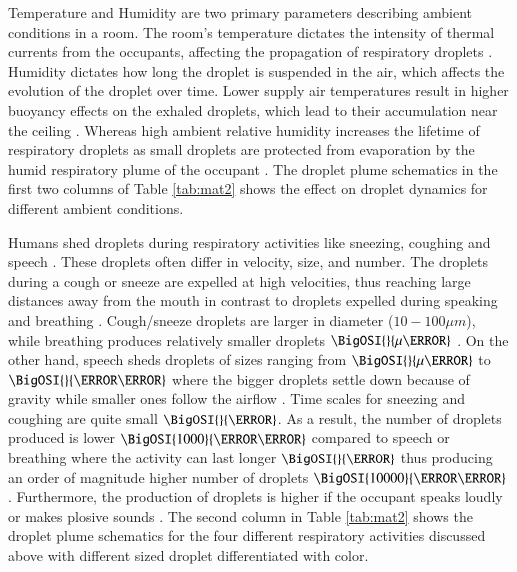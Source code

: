 \documentclass[preprint,12pt]{elsarticle}
\begin{document}
Temperature and Humidity are two primary parameters describing ambient conditions in a room. The room's temperature dictates the intensity of thermal currents from the occupants, affecting the propagation of respiratory droplets \cite{feng2020study}. Humidity dictates how long the droplet is suspended in the air, which affects the evolution of the droplet over time. Lower supply air temperatures result in higher buoyancy effects on the exhaled droplets, which lead to their accumulation near the ceiling \cite{zhang2019distribution}. Whereas high ambient relative humidity increases the lifetime of respiratory droplets as small droplets are protected from evaporation by the humid respiratory plume of the occupant \cite{chong2021extended}. The droplet plume schematics in the first two columns of Table \ref{tab:mat2} shows the effect on droplet dynamics for different ambient conditions.

Humans shed droplets during respiratory activities like sneezing, coughing and speech \cite{stadnytskyi2021breathing}. These droplets often differ in velocity, size, and number. The droplets during a cough or sneeze are expelled at high velocities, thus reaching large distances away from the mouth in contrast to droplets expelled during speaking and breathing \cite{pendar2020numerical,zhang2019distribution}. Cough/sneeze droplets are larger in diameter ($ 10-100 \mu m$), while breathing produces relatively smaller droplets $\BigOSI{}{\mu\meter}$ \cite{shao2021risk}. On the other hand, speech sheds droplets of sizes ranging from $\BigOSI{}{\mu\meter}$ to $\BigOSI{}{\milli\meter}$ where the bigger droplets settle down because of gravity while smaller ones follow the airflow \cite{tan2021experimental}. Time scales for sneezing and coughing are quite small $\BigOSI{}{\second}$. As a result, the number of droplets produced is lower $\BigOSI{1000}{\per\second}$ compared to speech or breathing where the activity can last longer $\BigOSI{}{\minute}$ thus producing an order of magnitude higher number of droplets $\BigOSI{10000}{\per\second}$ \cite{giri2022colliding}. Furthermore, the production of droplets is higher if the occupant speaks loudly or makes plosive sounds \cite{abkarian2020speech}. The second column in Table \ref{tab:mat2} shows the droplet plume schematics for the four different respiratory activities discussed above with different sized droplet differentiated with color.
\end{document}
